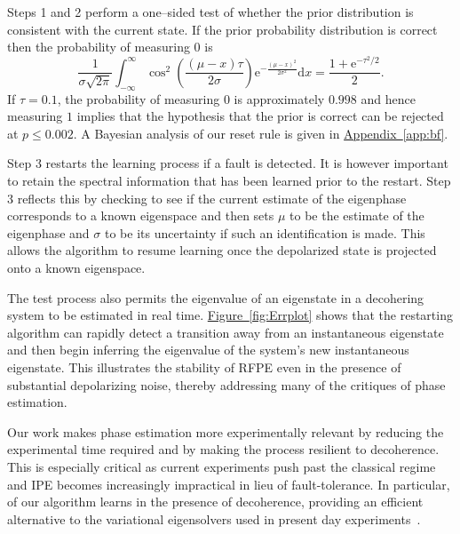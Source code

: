 \documentclass[aps,pra,amsmath,twocolumn,amssymb,superscriptaddress]{revtex4-1}
\newcommand{\app}[1]{\hyperref[app:#1]{Appendix~\ref*{app:#1}}}
\newcommand{\fig}[1]{\hyperref[fig:#1]{Figure~\ref*{fig:#1}}}
\newcommand{\ee}{\mathrm{e}}
\begin{document}
Steps 1 and 2 perform a one--sided test of whether the prior distribution is consistent with the current state.
If the prior probability distribution is correct then the probability of measuring $0$ is
\begin{equation}
    \frac{1}{\sigma\sqrt{2\pi}}\int_{-\infty}^\infty \cos^2\left(\frac{(\mu-x)\tau}{2\sigma}\right)\ee^{-\frac{(\mu-x)^2}{2\sigma^2}} \mathrm{d}x = \frac{1+\ee^{-\tau^2/2}}{2}.
\end{equation}
If $\tau=0.1$, the probability of measuring $0$ is approximately $0.998$ and hence measuring $1$ implies that the hypothesis that the prior is correct can be rejected at $p \le 0.002$. A Bayesian analysis of our reset rule
is given in \app{bf}.

Step 3 restarts the learning process if a fault is detected. It is however important to retain the spectral information that has been learned prior to the restart.  Step 3 reflects this by checking to see if the current estimate of the eigenphase corresponds to a known eigenspace and then sets $\mu$ to be the estimate of the eigenphase and $\sigma$ to be its uncertainty if such an identification is made.  This allows the algorithm to resume learning once the depolarized state is projected onto a known eigenspace.

The test process also permits the eigenvalue of an eigenstate in a decohering system to be estimated in real time. \fig{Errplot} shows that the restarting algorithm can rapidly detect a transition away from an instantaneous eigenstate and then begin inferring the eigenvalue of the system's new instantaneous eigenstate.  This illustrates the stability of RFPE even in the presence of substantial depolarizing noise, thereby addressing many of the critiques of phase estimation.


Our work makes phase estimation more
experimentally relevant by reducing the
experimental time required and by making the process resilient
to decoherence. This is especially critical as current experiments push past the classical
regime and IPE becomes increasingly impractical in lieu of fault-tolerance.
In particular, of our algorithm learns in the presence of decoherence, providing an efficient alternative to the
variational eigensolvers used in present day experiments~\cite{PMS+14,MBL+14,WHT15}.  
\end{document}
